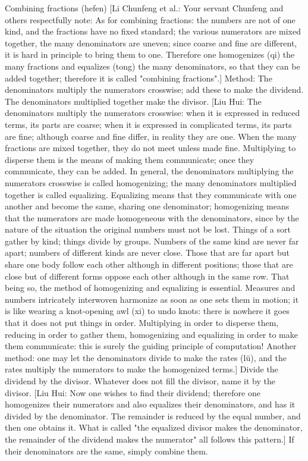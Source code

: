 \documentclass[11pt]{article}
\newenvironment{uniten}{\par\small\color{black!85}}{\par\medskip}
\begin{document}
\begin{uniten}Combining fractions (hefen) [Li Chunfeng et al.: Your servant Chunfeng and others respectfully note: As for combining fractions: the numbers are not of one kind, and the fractions have no fixed standard; the various numerators are mixed together, the many denominators are uneven; since coarse and fine are different, it is hard in principle to bring them to one. Therefore one homogenizes (qi) the many fractions and equalizes (tong) the many denominators, so that they can be added together; therefore it is called "combining fractions".] Method: The denominators multiply the numerators crosswise; add these to make the dividend. The denominators multiplied together make the divisor. [Liu Hui: The denominators multiply the numerators crosswise: when it is expressed in reduced terms, its parts are coarse; when it is expressed in complicated terms, its parts are fine; although coarse and fine differ, in reality they are one. When the many fractions are mixed together, they do not meet unless made fine. Multiplying to disperse them is the means of making them communicate; once they communicate, they can be added. In general, the denominators multiplying the numerators crosswise is called homogenizing; the many denominators multiplied together is called equalizing. Equalizing means that they communicate with one another and become the same, sharing one denominator; homogenizing means that the numerators are made homogeneous with the denominators, since by the nature of the situation the original numbers must not be lost. Things of a sort gather by kind; things divide by groups. Numbers of the same kind are never far apart; numbers of different kinds are never close. Those that are far apart but share one body follow each other although in different positions; those that are close but of different forms oppose each other although in the same row. That being so, the method of homogenizing and equalizing is essential. Measures and numbers intricately interwoven harmonize as soon as one sets them in motion; it is like wearing a knot-opening awl (xi) to undo knots: there is nowhere it goes that it does not put things in order. Multiplying in order to disperse them, reducing in order to gather them, homogenizing and equalizing in order to make them communicate: this is surely the guiding principle of computation! Another method: one may let the denominators divide to make the rates (lü), and the rates multiply the numerators to make the homogenized terms.] Divide the dividend by the divisor. Whatever does not fill the divisor, name it by the divisor. [Liu Hui: Now one wishes to find their dividend; therefore one homogenizes their numerators and also equalizes their denominators, and has it divided by the denominator. The remainder is reduced by the equal number, and then one obtains it. What is called "the equalized divisor makes the denominator, the remainder of the dividend makes the numerator" all follows this pattern.] If their denominators are the same, simply combine them.\end{uniten}
\end{document}
